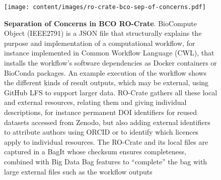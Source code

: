 \begin{figure}[t]
    \centering
    \texttt{[image: content/images/ro-crate-bco-sep-of-concerns.pdf]}
    \caption{\textbf{Separation of Concerns in BCO RO-Crate}. BioCompute Object (IEEE2791) is a JSON file that structurally explains the purpose and implementation of a computational workflow, for instance implemented in Common Workflow Language (CWL), that installs the workflow’s software dependencies as Docker containers or BioConda packages. An example execution of the workflow shows the different kinds of result outputs, which may be external, using GitHub LFS to support larger data. RO-Crate gathers all these local and external resources, relating them and giving individual descriptions, for instance permanent DOI identifiers for reused datasets accessed from Zenodo, but also adding external identifiers to attribute authors using ORCID or to identify which licences apply to individual resources. The RO-Crate and its local files are captured in a BagIt whose checksum ensures completeness, combined with Big Data Bag \cite{doi:10.1109/BigData.2016.7840618} features to “complete” the bag with large external files such as the workflow outputs}
    \label{fig:sep_concerns}
\end{figure}